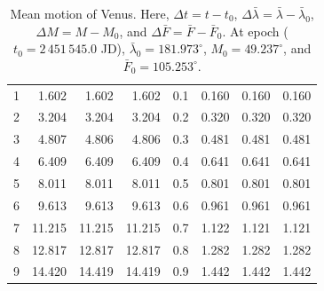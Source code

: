 \begin{table}[!h]
\begin{tabular}{rrrr|rrrr}
1 &   1.602 &   1.602 &   1.602 & 0.1 &   0.160 &   0.160 &   0.160\\
2 &   3.204 &   3.204 &   3.204 & 0.2 &   0.320 &   0.320 &   0.320\\
3 &   4.807 &   4.806 &   4.806 & 0.3 &   0.481 &   0.481 &   0.481\\
4 &   6.409 &   6.409 &   6.409 & 0.4 &   0.641 &   0.641 &   0.641\\
5 &   8.011 &   8.011 &   8.011 & 0.5 &   0.801 &   0.801 &   0.801\\
6 &   9.613 &   9.613 &   9.613 & 0.6 &   0.961 &   0.961 &   0.961\\
7 &  11.215 &  11.215 &  11.215 & 0.7 &   1.122 &   1.121 &   1.121\\
8 &  12.817 &  12.817 &  12.817 & 0.8 &   1.282 &   1.282 &   1.282\\
9 &  14.420 &  14.419 &  14.419 & 0.9 &   1.442 &   1.442 &   1.442\\
\end{tabular}
\caption{Mean motion of Venus.  Here, $\Delta t = t-t_0$, $\Delta\bar{\lambda} = \bar{\lambda}-\bar{\lambda}_0$,  $\Delta M = M - M_0$, and $\Delta\bar{F} = \bar{F}-\bar{F}_0$.  At epoch  ($t_0 = 2\,451\,545.0$ JD), $\bar{\lambda}_0 = 181.973^\circ$, $M_0 = 49.237^\circ$, and
$\bar{F}_0 =105.253^\circ$. }\label{vt17}
\end{table}

